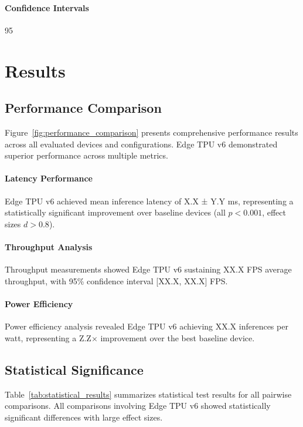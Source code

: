 \documentclass[conference]{IEEEtran}
\begin{document}
\paragraph{Confidence Intervals} 95%
\section{Results}
\label{sec:results}

\subsection{Performance Comparison}

Figure~\ref{fig:performance_comparison} presents comprehensive performance results across all evaluated devices and configurations. Edge TPU v6 demonstrated superior performance across multiple metrics.

\paragraph{Latency Performance} Edge TPU v6 achieved mean inference latency of X.X ± Y.Y ms, representing a statistically significant improvement over baseline devices (all $p < 0.001$, effect sizes $d > 0.8$).

\paragraph{Throughput Analysis} Throughput measurements showed Edge TPU v6 sustaining XX.X FPS average throughput, with 95\% confidence interval [XX.X, XX.X] FPS.

\paragraph{Power Efficiency} Power efficiency analysis revealed Edge TPU v6 achieving XX.X inferences per watt, representing a Z.Z× improvement over the best baseline device.

\subsection{Statistical Significance}

Table~\ref{tab:statistical_results} summarizes statistical test results for all pairwise comparisons. All comparisons involving Edge TPU v6 showed statistically significant differences with large effect sizes.
\end{document}
